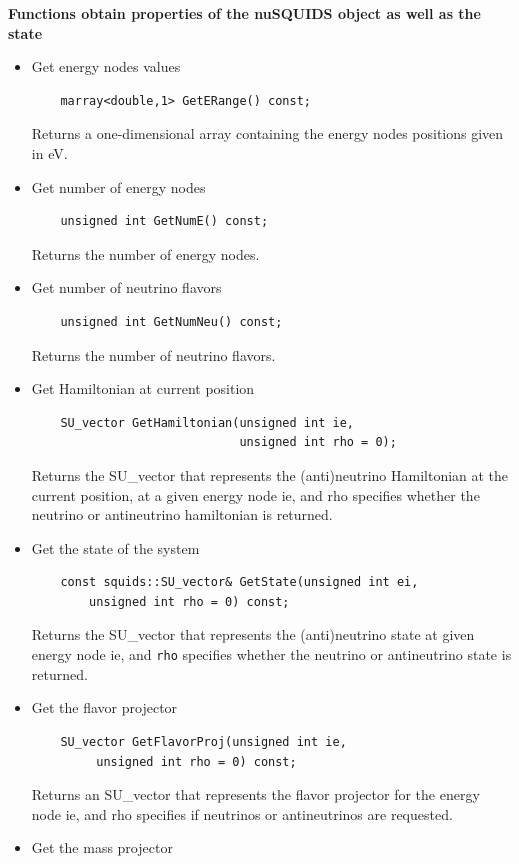 \documentclass[3p,12pt]{elsarticle}
\newcommand{\ttf}{\ttfamily}
\begin{document}
\textbf{Functions obtain properties of the nuSQUIDS object as well as the state}

\begin{itemize}
\item Get energy nodes values
  \begin{lstlisting}
    marray<double,1> GetERange() const;
  \end{lstlisting}
  Returns a one-dimensional array containing the energy nodes
  positions given in eV. 
  \item Get number of energy nodes
  \begin{lstlisting}
    unsigned int GetNumE() const;
  \end{lstlisting}
  Returns the number of energy nodes.
  \item Get number of neutrino flavors
  \begin{lstlisting}
    unsigned int GetNumNeu() const;
  \end{lstlisting}
  Returns the number of neutrino flavors.
  \item Get Hamiltonian at current position
  \begin{lstlisting}
    SU_vector GetHamiltonian(unsigned int ie, 
                             unsigned int rho = 0);
  \end{lstlisting}
  Returns the {\ttf SU\_vector} that represents the (anti)neutrino
  Hamiltonian at the current position, at a given energy node {\ttf
    ie}, and  {\ttf rho} specifies whether the neutrino or antineutrino hamiltonian is returned.
  \item Get the state of the system 
  \begin{lstlisting}
    const squids::SU_vector& GetState(unsigned int ei,
        unsigned int rho = 0) const;
  \end{lstlisting}
  Returns the {\ttf SU\_vector} that represents the (anti)neutrino state at given energy node {\ttf ie}, 
  and {\tt rho} specifies whether the neutrino or antineutrino state is returned.
  \item Get the flavor projector
  \begin{lstlisting}
    SU_vector GetFlavorProj(unsigned int ie,
         unsigned int rho = 0) const;
  \end{lstlisting}
  Returns an {\ttf SU\_vector} that represents the flavor projector for the energy node {\ttf ie}, and 
  {\ttf rho} specifies if neutrinos or antineutrinos are requested.
  \item Get the mass projector
  \begin{lstlisting}

\end{lstlisting}
\end{itemize}
\end{document}
